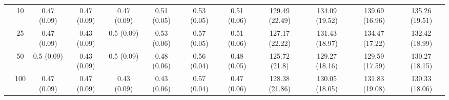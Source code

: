 \documentclass[11pt,3p,review,authoryear]{elsarticle}
\theoremstyle{definition}
\begin{document}
\begin{landscape}
\begin{table}[b]
\begin{center}
{\begin{tabular}{cc|ccc|ccc|cccc|}
    & 10  & 0.47 (0.09) & 0.47 (0.09) & 0.47 (0.09) & 0.51 (0.05) & 0.53 (0.05) & 0.51 (0.06) & 129.49 (22.49) & 134.09 (19.52) & 139.69 (16.96) & 135.26 (19.51) \\ 
    & 25  & 0.47 (0.09) & 0.43 (0.09) & 0.5 (0.09) & 0.53 (0.06) & 0.57 (0.05) & 0.51 (0.06) & 127.17 (22.22) & 131.43 (18.97) & 134.47 (17.22) & 132.42 (18.99) \\ 
    & 50  & 0.5 (0.09) & 0.43 (0.09) & 0.5 (0.09) & 0.48 (0.06) & 0.56 (0.04) & 0.48 (0.05) & 125.72 (21.8) & 129.27 (18.16) & 129.59 (17.59) & 130.27 (18.15) \\ 
    & 100  & 0.47 (0.09) & 0.47 (0.09) & 0.43 (0.09) & 0.43 (0.06) & 0.57 (0.04) & 0.47 (0.06) & 128.38 (21.86) & 130.05 (18.05) & 131.83 (19.08) & 130.33 (18.06) \\
\end{tabular}}
   \end{center}
\end{table}
\end{landscape}
\end{document}
